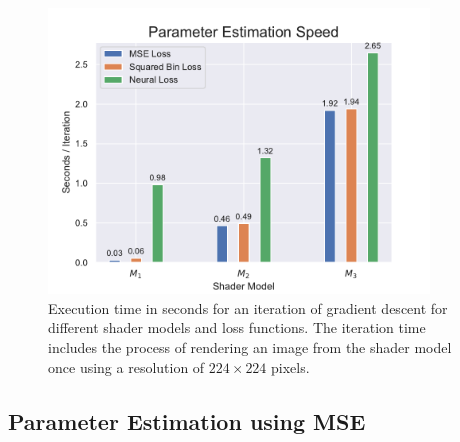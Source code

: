 \begin{figure}
    \centering
    \includegraphics[width=0.9\textwidth]{img/evaluation/Parameter Estimation Speed.pdf}
    \caption{Execution time in seconds for an iteration of gradient descent for different shader models and loss functions. The iteration time includes the process of rendering an image from the shader model once using a resolution of $224\times224$ pixels.}
    \label{fig:ParameterEstimationSpeed}
\end{figure}


\subsection{Parameter Estimation using MSE}

